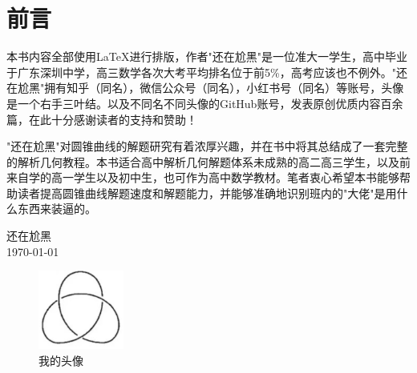 \documentclass[12pt,fontset=windows, a4paper, oneside,UTF8]{ctexbook}
\begin{document}

\frontmatter
\pagestyle{frontmatter} %
\chapter*{前言}
本书内容全部使用\LaTeX{}进行排版，作者"还在尬黑"是一位准大一学生，高中毕业于广东深圳中学，高三数学各次大考平均排名位于前5\%，高考应该也不例外。"还在尬黑"拥有知乎（同名），微信公众号（同名），小红书号（同名）等账号，头像是一个右手三叶结。以及不同名不同头像的GitHub账号，发表原创优质内容百余篇，在此十分感谢读者的支持和赞助！

"还在尬黑"对圆锥曲线的解题研究有着浓厚兴趣，并在书中将其总结成了一套完整的解析几何教程。本书适合高中解析几何解题体系未成熟的高二高三学生，以及前来自学的高一学生以及初中生，也可作为高中数学教材。笔者衷心希望本书能够帮助读者提高圆锥曲线解题速度和解题能力，并能够准确地识别班内的"大佬"是用什么东西来装逼的。
\begin{flushright}
    \vspace{2\baselineskip} %
    \kt 还在尬黑 \\ %
    \today
\end{flushright}
\begin{figure}[htbp]
	\centering
    \includegraphics[width=0.25\textwidth]{flg/logo.png}%
	\caption{我的头像}
	\label{fig0-1}
\end{figure}

\newpage
\CTEXoptions[tocdepth=2] %
\tableofcontents
\thispagestyle{tocmatter} 
\mainmatter
\pagestyle{mainmatter} %



\end{document}
